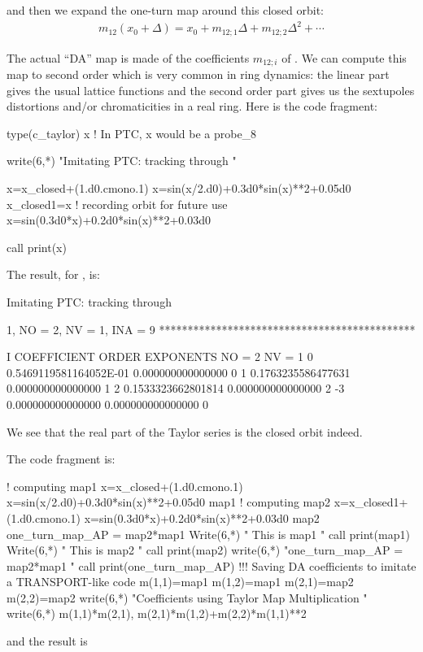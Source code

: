 \documentclass{hitec}     %
\begin{document}
{{{{{and then we expand the one-turn map around this closed orbit:
%
%
\begin{align} {m}_{12}({x}_{0}+\Delta )=
{x}_{0}+{m}_{12;1}\Delta +{m}_{12;2}{\Delta }^{2}+\cdots\label{eq:m1t0}\end{align}

The actual ``DA'' map is made of the coefficients $m_{12;i}$ of . We can compute this map to second order which is very common in ring dynamics: the linear part gives the usual lattice functions and the second order  part gives us the sextupoles distortions and/or chromaticities in a real ring. Here is the code fragment:

\begin{code}
type(c_taylor)  x   ! In PTC, x would be a probe_8

write(6,*) "Imitating PTC: tracking through  "

x=x_closed+(1.d0.cmono.1)
x=sin(x/2.d0)+0.3d0*sin(x)**2+0.05d0     
x_closed1=x	! recording orbit for future use
x=sin(0.3d0*x)+0.2d0*sin(x)**2+0.03d0

call print(x)
 \end{code}
 
 The result, for , is:
\begin{code}
 Imitating PTC: tracking through

          1, NO =    2, NV =    1, INA =    9
 *********************************************

    I  COEFFICIENT          ORDER   EXPONENTS
      NO =     2      NV =     1
   0  0.5469119581164052E-01   0.000000000000000       0
   1  0.1763235586477631       0.000000000000000       1
   2  0.1533323662801814       0.000000000000000       2
    -3   0.000000000000000       0.000000000000000       0
\end{code}
We see that the real part of the Taylor series is the closed orbit indeed.



The code fragment is:



\begin{code}
! computing map1
x=x_closed+(1.d0.cmono.1)
x=sin(x/2.d0)+0.3d0*sin(x)**2+0.05d0  
map1%
! computing map2
x=x_closed1+(1.d0.cmono.1)
x=sin(0.3d0*x)+0.2d0*sin(x)**2+0.03d0
map2%
one_turn_map_AP = map2*map1
Write(6,*) " This is map1 "
call print(map1)
Write(6,*) " This is map2 "
call print(map2)
write(6,*) "one_turn_map_AP = map2*map1 "
call print(one_turn_map_AP)
!!! Saving DA coefficients to imitate a TRANSPORT-like code
m(1,1)=map1%
m(1,2)=map1%
m(2,1)=map2%
m(2,2)=map2%
write(6,*) "Coefficients using Taylor Map Multiplication "
write(6,*) m(1,1)*m(2,1), m(2,1)*m(1,2)+m(2,2)*m(1,1)**2
\end{code} 
and the result is


}}}}}
\end{document}
